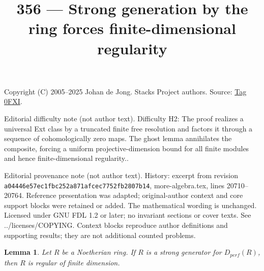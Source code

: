 \documentclass{amsart}
\theoremstyle{plain}
\newtheorem{lemma}[subsection]{Lemma}
\theoremstyle{definition}
\theoremstyle{remark}
\numberwithin{equation}{subsection}
\begin{document}
\title[Stacks Project, Tag 0FXI]{356 --- Strong generation by the ring forces finite-dimensional regularity}
\maketitle
\noindent Copyright (C) 2005--2025 Johan de Jong. Stacks Project authors. Source: \href{https://stacks.math.columbia.edu/tag/0FXI}{Tag 0FXI}.

\noindent Editorial difficulty note (not author text). Difficulty H2: The proof realizes a universal Ext class by a truncated finite free resolution and factors it through a sequence of cohomologically zero maps. The ghost lemma annihilates the composite, forcing a uniform projective-dimension bound for all finite modules and hence finite-dimensional regularity..

\noindent Editorial provenance note (not author text). History: excerpt from revision \texttt{a0444\allowbreak 6e57e\allowbreak c1fbc\allowbreak 252a8\allowbreak 71afc\allowbreak ec775\allowbreak 2fb28\allowbreak 07b14}, more-algebra.tex, lines 20710--20764. Reference presentation was adapted; original-author context and core support blocks were retained or added. The mathematical wording is unchanged. Licensed under GNU FDL 1.2 or later; no invariant sections or cover texts. See ../licenses/COPYING. Context blocks reproduce author definitions and supporting results; they are not additional counted problems.

\begin{lemma}
\label{lemma-not-regular-not-strong}
Let $R$ be a Noetherian ring. If $R$ is
a strong generator for $D_{perf}(R)$, then $R$ is regular
of finite dimension.
\end{lemma}
\end{document}

